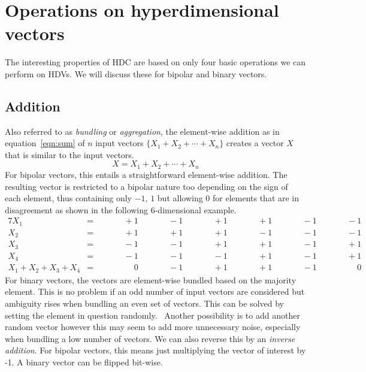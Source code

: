 \section{Operations on hyperdimensional vectors}
The interesting properties of HDC are based on only four basic operations we can perform on HDVs. We will discuss these for bipolar and binary vectors.
\subsection*{Addition} \label{sssec:add}
Also referred to as \textit{bundling} or \textit{aggregation}, the element-wise addition as in equation~\ref{eqn:sum} of $n$ input vectors $\{X_{1} + X_{2} + \cdots + X_{n}\}$ creates a vector $X$ that is similar to the input vectors.
\begin{equation}
    \label{eqn:sum}
    X = X_{1} + X_{2} + \cdots + X_{n}
\end{equation}
For bipolar vectors, this entails a straightforward element-wise addition. The resulting vector is restricted to a bipolar nature too depending on the sign of each element, thus containing only $-1$, $1$ but allowing $0$ for elements that are in disagreement as shown in the following $6$-dimensional example.
\begin{alignat*}{7}
    X_{1} &= && \qquad +1 && \qquad -1 && \qquad +1 && \qquad +1 && \qquad -1 && \qquad -1 \\
    X_{2} &= && \qquad +1 && \qquad +1 && \qquad +1 && \qquad -1 && \qquad -1 && \qquad -1 \\
    X_{3} &= && \qquad -1 && \qquad -1 && \qquad +1 && \qquad +1 && \qquad -1 && \qquad +1 \\
    X_{4} &= && \qquad -1 && \qquad -1 && \qquad -1 && \qquad +1 && \qquad -1 && \qquad +1 \\
    \hline
    X_{1} + X_{2} + X_{3} + X_{4} &= && \qquad \phantom{-}0 && \qquad -1 && \qquad +1 && \qquad +1 && \qquad -1 && \qquad \phantom{-}0
\end{alignat*}
For binary vectors, the vectors are element-wise bundled based on the majority element. This is no problem if an odd number of input vectors are considered but ambiguity rises when bundling an even set of vectors. This can be solved by setting the element in question randomly.~\cite{binBund} Another possibility is to add another random vector however this may seem to add more unnecessary noise, especially when bundling a low number of vectors. We can also reverse this by an \textit{inverse addition}. For bipolar vectors, this means just multiplying the vector of interest by -1. A binary vector can be flipped bit-wise.

